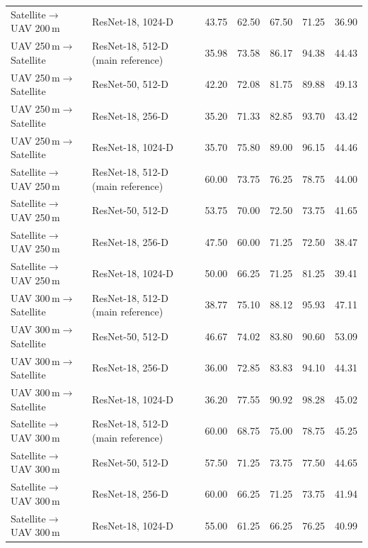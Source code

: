 \begin{table}[t]
{\begin{tabular}{llrrrrr}
Satellite$\rightarrow$UAV 200\,m & ResNet-18, 1024-D & 43.75 & 62.50 & 67.50 & 71.25 & 36.90 \\
\addlinespace
UAV 250\,m$\rightarrow$Satellite & ResNet-18, 512-D (main reference) & 35.98 & 73.58 & 86.17 & 94.38 & 44.43 \\
UAV 250\,m$\rightarrow$Satellite & ResNet-50, 512-D & 42.20 & 72.08 & 81.75 & 89.88 & 49.13 \\
UAV 250\,m$\rightarrow$Satellite & ResNet-18, 256-D & 35.20 & 71.33 & 82.85 & 93.70 & 43.42 \\
UAV 250\,m$\rightarrow$Satellite & ResNet-18, 1024-D & 35.70 & 75.80 & 89.00 & 96.15 & 44.46 \\
\addlinespace
Satellite$\rightarrow$UAV 250\,m & ResNet-18, 512-D (main reference) & 60.00 & 73.75 & 76.25 & 78.75 & 44.00 \\
Satellite$\rightarrow$UAV 250\,m & ResNet-50, 512-D & 53.75 & 70.00 & 72.50 & 73.75 & 41.65 \\
Satellite$\rightarrow$UAV 250\,m & ResNet-18, 256-D & 47.50 & 60.00 & 71.25 & 72.50 & 38.47 \\
Satellite$\rightarrow$UAV 250\,m & ResNet-18, 1024-D & 50.00 & 66.25 & 71.25 & 81.25 & 39.41 \\
\addlinespace
UAV 300\,m$\rightarrow$Satellite & ResNet-18, 512-D (main reference) & 38.77 & 75.10 & 88.12 & 95.93 & 47.11 \\
UAV 300\,m$\rightarrow$Satellite & ResNet-50, 512-D & 46.67 & 74.02 & 83.80 & 90.60 & 53.09 \\
UAV 300\,m$\rightarrow$Satellite & ResNet-18, 256-D & 36.00 & 72.85 & 83.83 & 94.10 & 44.31 \\
UAV 300\,m$\rightarrow$Satellite & ResNet-18, 1024-D & 36.20 & 77.55 & 90.92 & 98.28 & 45.02 \\
\addlinespace
Satellite$\rightarrow$UAV 300\,m & ResNet-18, 512-D (main reference) & 60.00 & 68.75 & 75.00 & 78.75 & 45.25 \\
Satellite$\rightarrow$UAV 300\,m & ResNet-50, 512-D & 57.50 & 71.25 & 73.75 & 77.50 & 44.65 \\
Satellite$\rightarrow$UAV 300\,m & ResNet-18, 256-D & 60.00 & 66.25 & 71.25 & 73.75 & 41.94 \\
Satellite$\rightarrow$UAV 300\,m & ResNet-18, 1024-D & 55.00 & 61.25 & 66.25 & 76.25 & 40.99 \\
\bottomrule
\end{tabular}%
}
\end{table}
